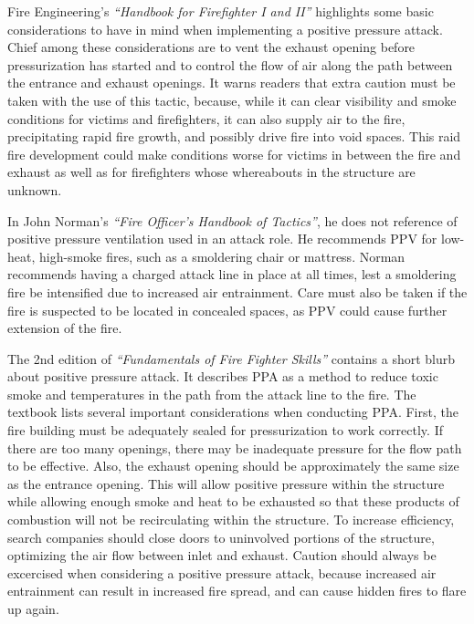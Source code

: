 \documentclass{article}
\begin{document}
Fire Engineering’s \textit{``Handbook for Firefighter I and II''} highlights some basic considerations to have in mind when implementing a positive pressure attack. Chief among these considerations are to vent the exhaust opening before pressurization has started and to control the flow of air along the path between the entrance and exhaust openings. It warns readers that extra caution must be taken with the use of this tactic, because, while it can clear visibility and smoke conditions for victims and firefighters, it can also supply air to the fire, precipitating rapid fire growth, and possibly drive fire into void spaces. This raid fire development could make conditions worse for victims in between the fire and exhaust as well as for firefighters whose whereabouts in the structure are unknown.\cite{FE_FireI_II}

In John Norman’s \textit{``Fire Officer’s Handbook of Tactics''}, he does not reference of positive pressure ventilation used in an attack role. He recommends PPV for low-heat, high-smoke fires, such as a smoldering chair or mattress. Norman recommends having a charged attack line in place at all times, lest a smoldering fire be intensified due to increased air entrainment. Care must also be taken if the fire is suspected to be located in concealed spaces, as PPV could cause further extension of the fire.\cite{NormanHandbook}

The 2nd edition of \textit{``Fundamentals of Fire Fighter Skills''} contains a short blurb about positive pressure attack. It describes PPA as a method to reduce toxic smoke and temperatures in the path from the attack line to the fire. The textbook lists several important considerations when conducting PPA. First, the fire building must be adequately sealed for pressurization to work correctly. If there are too many openings, there may be inadequate pressure for the flow path to be effective. Also, the exhaust opening should be approximately the same size as the entrance opening. This will allow positive pressure within the structure while allowing enough smoke and heat to be exhausted so that these products of combustion will not be recirculating within the structure. To increase efficiency, search companies should close doors to uninvolved portions of the structure, optimizing the air flow between inlet and exhaust. Caution should always be excercised when considering a positive pressure attack, because increased air entrainment can result in increased fire spread, and can cause hidden fires to flare up again.\cite{NFPA_IAFC}
\end{document}
